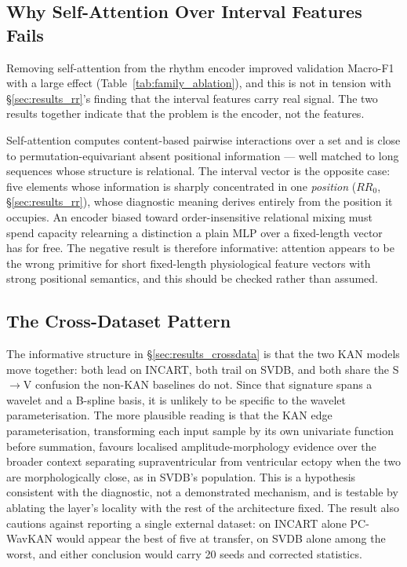 \documentclass[journal,twoside,web]{ieeecolor}
\begin{document}
\subsection{Why Self-Attention Over Interval Features Fails}
\label{sec:discussion_rr}
Removing self-attention from the rhythm encoder improved validation Macro-F1 with a large effect (Table~\ref{tab:family_ablation}), and this is not in tension with \S\ref{sec:results_rr}'s finding that the interval features carry real signal. The two results together indicate that the problem is the encoder, not the features.

Self-attention computes content-based pairwise interactions over a set and is close to permutation-equivariant absent positional information --- well matched to long sequences whose structure is relational. The interval vector is the opposite case: five elements whose information is sharply concentrated in one \emph{position} ($RR_0$, \S\ref{sec:results_rr}), whose diagnostic meaning derives entirely from the position it occupies. An encoder biased toward order-insensitive relational mixing must spend capacity relearning a distinction a plain MLP over a fixed-length vector has for free. The negative result is therefore informative: attention appears to be the wrong primitive for short fixed-length physiological feature vectors with strong positional semantics, and this should be checked rather than assumed.

\subsection{The Cross-Dataset Pattern}
The informative structure in \S\ref{sec:results_crossdata} is that the two KAN models move together: both lead on INCART, both trail on SVDB, and both share the S$\rightarrow$V confusion the non-KAN baselines do not. Since that signature spans a wavelet and a B-spline basis, it is unlikely to be specific to the wavelet parameterisation. The more plausible reading is that the KAN edge parameterisation, transforming each input sample by its own univariate function before summation, favours localised amplitude-morphology evidence over the broader context separating supraventricular from ventricular ectopy when the two are morphologically close, as in SVDB's population. This is a hypothesis consistent with the diagnostic, not a demonstrated mechanism, and is testable by ablating the layer's locality with the rest of the architecture fixed. The result also cautions against reporting a single external dataset: on INCART alone PC-WavKAN would appear the best of five at transfer, on SVDB alone among the worst, and either conclusion would carry 20 seeds and corrected statistics.
\end{document}
